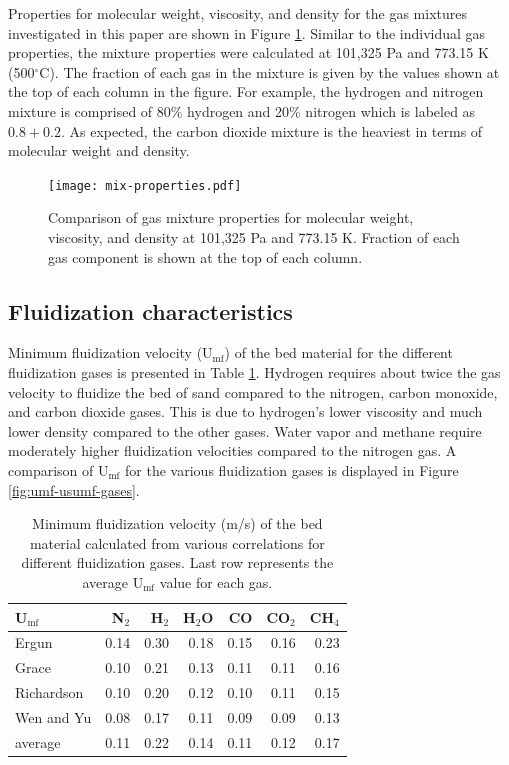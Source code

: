 Properties for molecular weight, viscosity, and density for the gas mixtures investigated in this paper are shown in Figure \ref{fig:mix-properties}. Similar to the individual gas properties, the mixture properties were calculated at 101,325 Pa and 773.15 K (500$^\circ$C). The fraction of each gas in the mixture is given by the values shown at the top of each column in the figure. For example, the hydrogen and nitrogen mixture is comprised of 80\% hydrogen and 20\% nitrogen which is labeled as $0.8 + 0.2$. As expected, the carbon dioxide mixture is the heaviest in terms of molecular weight and density.

\begin{figure}[H]
    \centering
    \texttt{[image: mix-properties.pdf]}
    \caption{Comparison of gas mixture properties for molecular weight, viscosity, and density at 101,325 Pa and 773.15 K. Fraction of each gas component is shown at the top of each column.}
    \label{fig:mix-properties}
\end{figure}


\subsection{Fluidization characteristics}

Minimum fluidization velocity (U$_\text{mf}$) of the bed material for the different fluidization gases is presented in Table \ref{tab:umf-sand}. Hydrogen requires about twice the gas velocity to fluidize the bed of sand compared to the nitrogen, carbon monoxide, and carbon dioxide gases. This is due to hydrogen's lower viscosity and much lower density compared to the other gases. Water vapor and methane require moderately higher fluidization velocities compared to the nitrogen gas. A comparison of U$_\text{mf}$ for the various fluidization gases is displayed in Figure \ref{fig:umf-usumf-gases}.

\begin{table}[H]
    \centering
    \caption{Minimum fluidization velocity (m/s) of the bed material calculated from various correlations for different fluidization gases. Last row represents the average U$_\text{mf}$ value for each gas.}
    \label{tab:umf-sand}
    \begin{tabular}{lrrrrrr}
        \toprule
        U$_\text{mf}$ & N$_2$ & H$_2$ & H$_2$O & CO & CO$_2$ & CH$_4$ \\
        \midrule
        Ergun         & 0.14 & 0.30 & 0.18 & 0.15 & 0.16 & 0.23 \\
        Grace         & 0.10 & 0.21 & 0.13 & 0.11 & 0.11 & 0.16 \\
        Richardson    & 0.10 & 0.20 & 0.12 & 0.10 & 0.11 & 0.15 \\
        Wen and Yu    & 0.08 & 0.17 & 0.11 & 0.09 & 0.09 & 0.13 \\
        average       & 0.11 & 0.22 & 0.14 & 0.11 & 0.12 & 0.17 \\
        \bottomrule
    \end{tabular}
\end{table}

